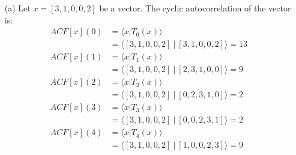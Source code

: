 \documentclass[12pt]{article}
\begin{document}
\begin{itemize}
    \item[(a)]
    Let $x=[3,1,0,0,2]$ be a vector. The cyclic autocorrelation of the vector is:
    \begin{align*}
        ACF[x](0) &= \langle x | T_0(x) \rangle \\
        &= \langle [3,1,0,0,2] ~|~ [3,1,0,0,2] \rangle = 13\\
        ACF[x](1) &= \langle x | T_1(x) \rangle \\
        &= \langle [3,1,0,0,2] ~|~ [2,3,1,0,0] \rangle = 9\\
         ACF[x](2) &= \langle x | T_2(x) \rangle \\
        &= \langle [3,1,0,0,2] ~|~ [0,2,3,1,0] \rangle = 2\\
        ACF[x](3) &= \langle x | T_3(x) \rangle \\
        &= \langle [3,1,0,0,2] ~|~ [0,0,2,3,1] \rangle = 2\\
        ACF[x](4) &= \langle x | T_4(x) \rangle \\
        &= \langle [3,1,0,0,2] ~|~ [1,0,0,2,3] \rangle = 9\\
    \end{align*}


\end{itemize}
\end{document}
